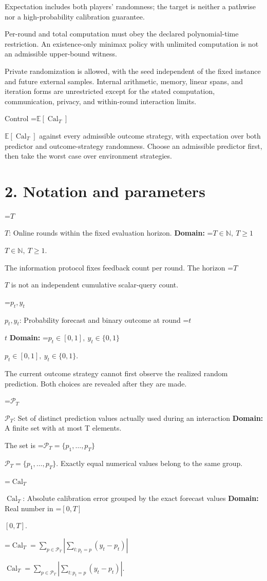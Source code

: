 \documentclass[10pt,a4paper]{article}
\newcommand{\AtlasMath}[1]{\par\begingroup\centering\setbox0=\hbox{$\displaystyle #1$}\ifdim\wd0>1.4\linewidth\typeout{ATLAS WIDE FORMULA: \the\wd0}\fi\ifdim\wd0>\linewidth\resizebox{\linewidth}{!}{\box0}\else\box0\fi\par\endgroup}
\newcommand{\AtlasInlineMath}[1]{\begingroup\setbox0=\hbox{$#1$}\ifdim\wd0>.4\linewidth\endgroup\AtlasMath{#1}\else\endgroup$#1$\fi}
\begin{document}
Expectation includes both players' randomness; the target is neither a pathwise nor a high-probability calibration guarantee.

Per-round and total computation must obey the declared polynomial-time restriction. An existence-only minimax policy with unlimited computation is not an admissible upper-bound witness.

Private randomization is allowed, with the seed independent of the fixed instance and future external samples. Internal arithmetic, memory, linear spans, and iteration forms are unrestricted except for the stated computation, communication, privacy, and within-round interaction limits.

Control \AtlasInlineMath{\mathbb{E}[\operatorname{Cal}_T]} against every admissible outcome strategy, with expectation over both predictor and outcome-strategy randomness. Choose an admissible predictor first, then take the worst case over environment strategies.

\section{2. Notation and parameters}
\AtlasInlineMath{T}: Online rounds within the fixed evaluation horizon. \textbf{Domain:} \AtlasInlineMath{T\in\mathbb N,\ T\ge1}.

The information protocol fixes feedback count per round. The horizon \AtlasInlineMath{T} is not an independent cumulative scalar-query count.

\AtlasInlineMath{p_t,y_t}: Probability forecast and binary outcome at round \AtlasInlineMath{t} \textbf{Domain:} \AtlasInlineMath{p_t\in[0,1],\ y_t\in\{0,1\}}.

The current outcome strategy cannot first observe the realized random prediction. Both choices are revealed after they are made.

\AtlasInlineMath{\mathcal P_T}: Set of distinct prediction values actually used during an interaction \textbf{Domain:} A finite set with at most T elements.

The set is \AtlasInlineMath{\mathcal P_T=\{p_1,\ldots,p_T\}}. Exactly equal numerical values belong to the same group.

\AtlasInlineMath{\operatorname{Cal}_T}: Absolute calibration error grouped by the exact forecast values \textbf{Domain:} Real number in \AtlasInlineMath{[0,T]}.

\AtlasInlineMath{\operatorname{Cal}_T=\sum_{p\in\mathcal P_T}|\sum_{t:p_t=p}(y_t-p_t)|}.
\end{document}
